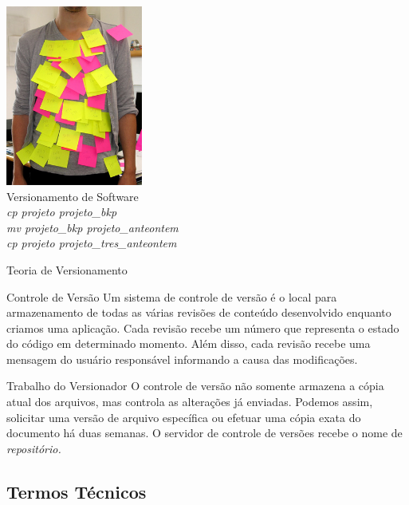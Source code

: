 \documentclass[hyperref={pdfpagelabels=false}]{beamer}
\begin{document}
\begin{frame}
    \begin{center}
        \includegraphics[width=45mm]{src/archiving72dpi.jpg}\\
        Versionamento de Software\\
        \textit{cp projeto projeto\_bkp}\\
        \textit{mv projeto\_bkp projeto\_anteontem}\\
        \textit{cp projeto projeto\_tres\_anteontem}\\
    \end{center}
\end{frame}

\begin{frame}{Teoria de Versionamento}
    \begin{block}{Controle de Versão}
        Um sistema de controle de versão é o local para armazenamento de todas
        as várias revisões de conteúdo desenvolvido enquanto criamos uma
        aplicação\cite{mason2005}. Cada revisão recebe um número que representa
        o estado do código em determinado momento. Além disso, cada revisão
        recebe uma mensagem do usuário responsável informando a causa das
        modificações.
    \end{block}
    \pause{}
    \begin{block}{Trabalho do Versionador}
        O controle de versão não somente armazena a cópia atual dos arquivos,
        mas controla as alterações já enviadas. Podemos assim, solicitar uma
        versão de arquivo específica ou efetuar uma cópia exata do documento há
        duas semanas. O servidor de controle de versões recebe o nome de
        \em{repositório}.
    \end{block}
\end{frame}

\subsection{Termos Técnicos}
\end{document}
